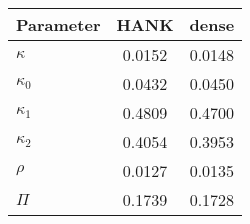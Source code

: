 \begin{tabular}{lcc} 
\toprule 
Parameter & HANK & dense\\
\midrule 
 $\kappa$ & 0.0152 & 0.0148 \\ 
 $\kappa_0$ & 0.0432 & 0.0450 \\ 
 $\kappa_1$ & 0.4809 & 0.4700 \\ 
 $\kappa_2$ & 0.4054 & 0.3953 \\ 
 $\rho$ & 0.0127 & 0.0135 \\ 
 $\Pi$ & 0.1739 & 0.1728 \\ 
\bottomrule
\end{tabular}
